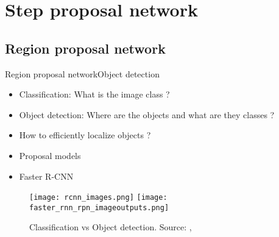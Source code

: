 \section{Step proposal network}


\subsection{Region proposal network}



\begin{frame}{Region proposal network}{Object detection}
\begin{itemize}
    \item Classification: What is the image class ?
    \pause
    \item Object detection: Where are the objects and what are they classes ?
    \pause
    \item How to efficiently localize objects ?
    \item Proposal models \cite{hosang2016what}
    \item Faster R-CNN \cite{ren2015faster}
\end{itemize}
\begin{figure}
    \texttt{[image: rcnn\_images.png]}
    \texttt{[image: faster\_rnn\_rpn\_imageoutputs.png]}
    \caption{Classification vs Object detection. Source: \cite{girshick2014rich},  \cite{ren2015faster}}
\end{figure}

\end{frame}

